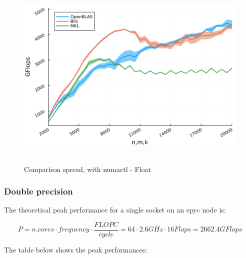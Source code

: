 \documentclass[
  letterpaper,
  DIV=11,
  numbers=noendperiod]{scrartcl}
\begin{document}
\begin{figure}

{\centering \includegraphics[width=\textwidth,height=3.64583in]{img/float_numactl_spread_comparison.png}

}

\caption{Comparison spread, with numactl - Float}

\end{figure}

\newpage

\hypertarget{double-precision}{%
\subsubsection{Double precision}\label{double-precision}}

The theoretical peak performance for a single socket on an epyc node is:

\[
P = n. cores\cdot frequency \cdot \frac{FLOPC}{cycle} = 64\cdot 2.6 GHz\cdot 16 Flops = 2662.4 GFlops
\]

The table below shows the peak performances:
\end{document}
